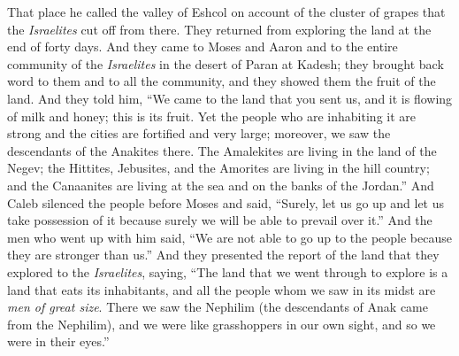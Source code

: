 \begin{biblechapter}
\verse That place he called the valley of Eshcol on account of the cluster of grapes that the \textit{Israelites} cut off from there.
 They returned from exploring the land at the end of forty days.
\verse And they came to Moses and Aaron and to the entire community of the \textit{Israelites} in the desert of Paran at Kadesh; they brought back word to them and to all the community, and they showed them the fruit of the land.
\verse And they told him, “We came to the land that you sent us, and it is flowing of milk and honey; this is its fruit.
\verse Yet the people who are inhabiting it are strong and the cities are fortified and very large; moreover, we saw the descendants of the Anakites there.
\verse The Amalekites are living in the land of the Negev; the Hittites, Jebusites, and the Amorites are living in the hill country; and the Canaanites are living at the sea and on the banks of the Jordan.”
\verse And Caleb silenced the people before Moses and said, “Surely, let us go up and let us take possession of it because surely we will be able to prevail over it.”
\verse And the men who went up with him said, “We are not able to go up to the people because they are stronger than us.”
\verse And they presented the report of the land that they explored to the \textit{Israelites}, saying, “The land that we went through to explore is a land that eats its inhabitants, and all the people whom we saw in its midst are \textit{men of great size}.
\verse There we saw the Nephilim (the descendants of Anak came from the Nephilim), and we were like grasshoppers in our own sight, and so we were in their eyes.”
\end{biblechapter}

